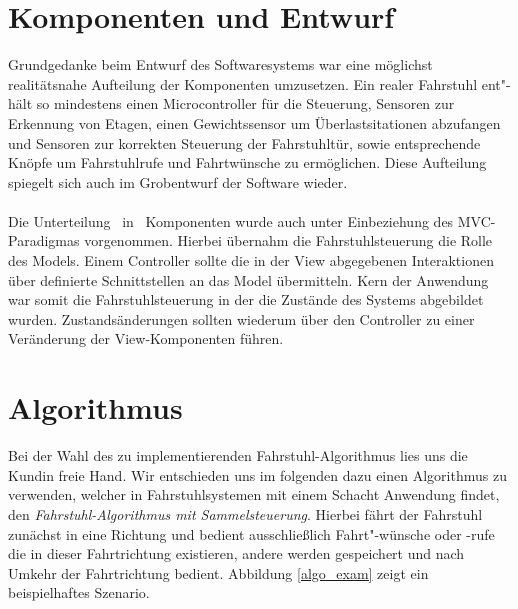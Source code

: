 \section{Komponenten und Entwurf}
Grundgedanke beim Entwurf des Softwaresystems war eine möglichst realitätsnahe Aufteilung der Komponenten umzusetzen. Ein realer Fahrstuhl ent"-hält so mindestens einen Microcontroller für die Steuerung, Sensoren zur Erkennung von Etagen, einen Gewichtssensor um Überlastsitationen abzufangen und Sensoren zur korrekten Steuerung der Fahrstuhltür, sowie entsprechende Knöpfe um Fahrstuhlrufe und Fahrtwünsche zu ermöglichen. Diese Aufteilung spiegelt sich auch im Grobentwurf der Software wieder.

\paragraph{}Die Unterteilung \mbox{ in } Komponenten wurde auch unter Einbeziehung des MVC-Paradigmas vorgenommen. Hierbei übernahm die Fahrstuhlsteuerung die Rolle des Models. Einem Controller sollte die in der View abgegebenen Interaktionen über definierte Schnittstellen an das Model übermitteln. Kern der Anwendung war somit die Fahrstuhlsteuerung in der die Zustände des Systems abgebildet wurden. Zustandsänderungen sollten wiederum über den Controller zu einer Veränderung der View-Komponenten führen. 

\newpage
\section{Algorithmus}
\label{alg}
Bei der Wahl des zu implementierenden Fahrstuhl-Algorithmus lies uns die Kundin freie Hand. Wir entschieden uns im folgenden dazu einen Algorithmus zu verwenden, welcher in Fahrstuhlsystemen mit einem Schacht Anwendung findet, den \textit{Fahrstuhl-Algorithmus mit Sammelsteuerung}\cite{wiki_elev}. Hierbei fährt der Fahrstuhl zunächst in eine Richtung und bedient ausschließlich Fahrt"-wünsche oder -rufe die in dieser Fahrtrichtung existieren, andere werden gespeichert und nach Umkehr der Fahrtrichtung bedient. Abbildung \ref{algo_exam} zeigt ein beispielhaftes Szenario.


